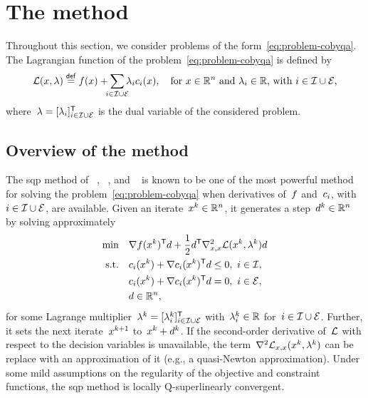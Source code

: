 \section{The  method}

Throughout this section, we consider problems of the form~\cref{eq:problem-cobyqa}.
The Lagrangian function of the problem~\cref{eq:problem-cobyqa} is defined by
\begin{equation*}
    \lag(\iter, \lambda) \eqdef \obj(\iter) + \sum_{\mathclap{i \in \iub \cup \ieq}} \lambda_i \con{i}(\iter), \quad \text{for~$\iter \in \R^n$ and~$\lambda_i \in \R$, with~$i \in \iub \cup \ieq$,}
\end{equation*}
where~$\lambda = [\lambda_i]_{i \in \mathcal{I} \cup \mathcal{E}}^{\mathsf{T}}$ is the dual variable of the considered problem.

\subsection{Overview of the method}

The \gls{sqp} method of \citeauthor{Wilson_1963}~\cite{Wilson_1963}, \citeauthor{Han_1976}~\cite{Han_1976,Han_1977}, and \citeauthor{Powell_1978a}~\cite{Powell_1978a,Powell_1978b} is known to be one of the most powerful method for solving the problem~\cref{eq:problem-cobyqa} when derivatives of~$f$ and~$c_{i}$, with~$i \in \mathcal{I} \cup \mathcal{E}$, are available.
Given an iterate~$\iter[k] \in \R^n$, it generates a step~$d^k \in \mathbb{R}^n$ by solving approximately
\begin{subequations}
    \label{eq:sqp-subproblem}
    \begin{align}
        \min        & \quad \nabla \obj(\iter[k])^{\T} \step + \frac{1}{2} \step^{\T} \nabla_{x, x}^2 \lag(\iter[k], \lambda^k) \step \label{eq:sqp-subproblem-obj}\\
        \text{s.t.} & \quad \con{i}(\iter[k]) + \nabla \con{i}(\iter[k])^{\T} \step \le 0, ~ i \in \iub,\\
                    & \quad \con{i}(\iter[k]) + \nabla \con{i}(\iter[k])^{\T} \step = 0, ~ i \in \ieq,\\
                    & \quad \step \in \R^n,
    \end{align}
\end{subequations}
for some Lagrange multiplier~$\lambda^k = [\lambda_i^k]_{i \in \mathcal{I} \cup \mathcal{E}}^{\mathsf{T}}$ with~$\lambda_i^k \in \mathbb{R}$ for~$i \in \mathcal{I} \cup \mathcal{E}$.
Further, it sets the next iterate~$\iter[k + 1]$ to~$\iter[k] + d^k$.
If the second-order derivative of~$\lag$ with respect to the decision variables is unavailable, the term~$\nabla^2 \lag_{x, x}(\iter[k], \lambda^k)$ can be replace with an approximation of it (e.g., a quasi-Newton approximation).
Under some mild assumptions on the regularity of the objective and constraint functions, the \gls{sqp} method is locally Q-superlinearly convergent.

